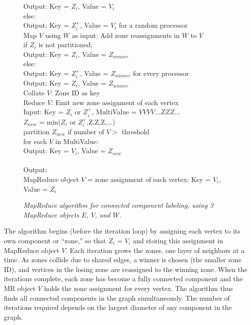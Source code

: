 \begin{figure}[htb]
\begin{center}
{\begin{minipage}{\textwidth}
\begin{tabbing}
    \> \> \> Output: Key = $Z_i$, Value = $V_i$ \\
    \> \> else: \\
    \> \> \> Output: Key = $Z_i^+$, Value = $V_i$ for a random processor \\
 Map $V$ using $W$ as input: Add zone reassignments in $W$ to $V$ \\
    \> \> if $Z_i$ is not partitioned: \\
    \> \> \> Output: Key = $Z_i$, Value = $Z_{winner}$ \\
    \> \> else: \\
    \> \> \> Output: Key = $Z_i^+$, Value = $Z_{winner}$ for every processor \\
    \> \> \> Output: Key = $Z_i$, Value = $Z_{winner}$ \\
 Collate $V$: Zone ID as key \\
 Reduce $V$: Emit new zone assignment of each vertex \\
       \> \> Input: Key = $Z_i$ or $Z_i^+$, MultiValue = $V V V V ... Z Z Z ...$ \\
       \> \> $Z_{new}$ = min($Z_i$ or $Z_i^+$,Z,Z,Z,...) \\
       \> \> partition $Z_{new}$ if number of $V >$ threshold \\
       \> \> for each $V$ in MultiValue: \\
       \> \> \> Output: Key = $V_i$, Value = $Z_{new}$ \\
\\
Output: \\
\> MapReduce object $V$ = zone assignment of each vertex: Key = $V_i$, Value = $Z_i$ 
  \end{tabbing}
 \end{minipage}}\end{center}

 \caption{\it MapReduce algorithm for connected component labeling,
 using 3 MapReduce objects $E$, $V$, and $W$.}

 \label{fig:cc}
\end{figure}

The algorithm begins (before the iteration loop) by assigning each
vertex to its own component or ``zone,'' so that $Z_i$ = $V_i$ and
storing this assignment in MapReduce object $V$.  Each iteration grows
the zones, one layer of neighbors at a time.  As zones collide due to
shared edges, a winner is chosen (the smaller zone ID), and vertices
in the losing zone are reassigned to the winning zone.  When the
iterations complete, each zone has become a fully connected component
and the MR object $V$ holds the zone assignment for every vertex.  The
algorithm thus finds all connected components in the graph
simultaneously.  The number of iterations required depends on the
largest diameter of any component in the graph.

